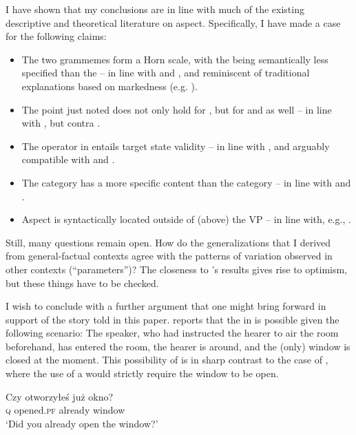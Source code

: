 \documentclass[output=paper,modfonts,newtxmath,hidelinks]{langscibook}
\begin{document}
I have shown that my conclusions are in line with much of the existing descriptive and theoretical literature on  aspect.
Specifically, I have made a case 
for the following claims:
\begin{itemize}
\item The two  grammemes form a Horn scale, with the  being semantically less specified than the  -- in line with \citet{Sonne06} and \citet{Gronn2004}, and reminiscent of traditional explanations based on markedness (e.g. \citealt[15--16]{Maslov1984}).
\item The point just noted does not only hold for , but for  and  as well -- in line with \citet[116]{FK18}, but contra \citet[105]{Dickey2000}.
\item The  operator in  entails target state validity -- in line with \citet{Gronn2004}, and arguably compatible with \citet{Barentsen98} and \citet{Dickey2000}.
 \item The   category has a more specific content than the   category -- in line with \citet{Stunova1991} and \citet{Dickey18}.
 \item Aspect is syntactically located outside of (above) the VP -- in line with, e.g., \citet{Tate11}.
 \end{itemize}

\noindent Still, many questions remain open. How do the generalizations that I derived from general-factual contexts agree with the patterns of  variation observed in other
contexts (``parameters'')? The closeness to \citeauthor{Stunova1991}'s results gives rise to optimism, but these things have to be checked.  

I wish to conclude with a further argument that one might bring forward in support of the story told in this paper. 
\citet[112]{Dickey2000} reports that the   in  is possible given the following scenario: 
The speaker, who had instructed the hearer to air the room beforehand, has entered the room, the hearer is around, and the (only) window is closed at the moment.   
This possibility of  is in sharp contrast to the case of , where the 
use of a  would strictly require the window to be open. 

\begin{exe}
\ex\label{13:win}
\gll Czy otworzy\l{e}\'s ju\.z okno? \\
\textsc{q} opened.\textsc{pf} already window\\
\glt `Did you already open the window?'
\end{exe}
\end{document}
